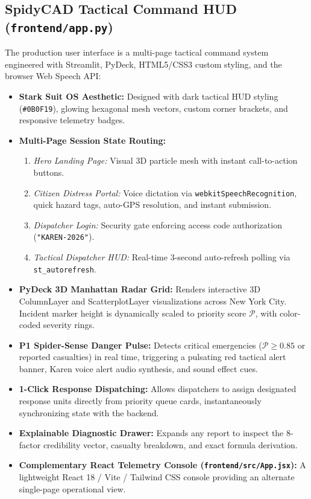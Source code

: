 \documentclass[10pt,a4paper]{article}
\begin{document}
\subsection{SpidyCAD Tactical Command HUD (\texttt{frontend/app.py})}
The production user interface is a multi-page tactical command system engineered with Streamlit, PyDeck, HTML5/CSS3 custom styling, and the browser Web Speech API:
\begin{itemize}
  \item \textbf{Stark Suit OS Aesthetic:} Designed with dark tactical HUD styling (\texttt{\#0B0F19}), glowing hexagonal mesh vectors, custom corner brackets, and responsive telemetry badges.
  \item \textbf{Multi-Page Session State Routing:}
    \begin{enumerate}
      \item \emph{Hero Landing Page:} Visual 3D particle mesh with instant call-to-action buttons.
      \item \emph{Citizen Distress Portal:} Voice dictation via \texttt{webkitSpeechRecognition}, quick hazard tags, auto-GPS resolution, and instant submission.
      \item \emph{Dispatcher Login:} Security gate enforcing access code authorization (\texttt{"KAREN-2026"}).
      \item \emph{Tactical Dispatcher HUD:} Real-time 3-second auto-refresh polling via \texttt{st\_autorefresh}.
    \end{enumerate}
  \item \textbf{PyDeck 3D Manhattan Radar Grid:} Renders interactive 3D ColumnLayer and ScatterplotLayer visualizations across New York City. Incident marker height is dynamically scaled to priority score $\mathcal{P}$, with color-coded severity rings.
  \item \textbf{P1 Spider-Sense Danger Pulse:} Detects critical emergencies ($\mathcal{P} \ge 0.85$ or reported casualties) in real time, triggering a pulsating red tactical alert banner, Karen voice alert audio synthesis, and sound effect cues.
  \item \textbf{1-Click Response Dispatching:} Allows dispatchers to assign designated response units directly from priority queue cards, instantaneously synchronizing state with the backend.
  \item \textbf{Explainable Diagnostic Drawer:} Expands any report to inspect the 8-factor credibility vector, casualty breakdown, and exact formula derivation.
  \item \textbf{Complementary React Telemetry Console (\texttt{frontend/src/App.jsx}):} A lightweight React 18 / Vite / Tailwind CSS console providing an alternate single-page operational view.
\end{itemize}
\end{document}
